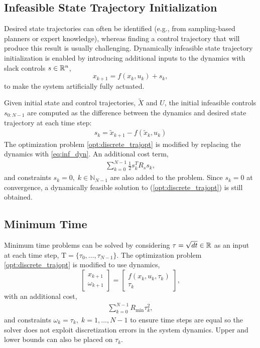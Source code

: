 \documentclass[../root.tex]{subfiles}
\begin{document}
\subsection{Infeasible State Trajectory Initialization}
    Desired state trajectories can often be identified (e.g., from sampling-based
    planners or expert knowledge), whereas finding a control trajectory that will
    produce this result is usually challenging. Dynamically infeasible state
    trajectory initialization is enabled by introducing additional inputs to the
    dynamics with slack controls $s \in \mathbb{R}^{n}$,
    \begin{equation}
        x_{k+1} = f(x_k,u_k) + s_k \label{eq:inf_dyn},
    \end{equation}
    to make the system artificially fully actuated. 

    Given initial state and control trajectories, $\tilde{X}$ and $U$, the
    initial infeasible controls $s_{0:N-1}$ are computed as the difference
    between the dynamics and desired state trajectory at each time step:
    \begin{align}
        s_k = \tilde{x}_{k+1} - f(\tilde{x}_k,u_k) \label{infeasible_controls}
    \end{align}
    The optimization problem \eqref{opt:discrete_trajopt} is modified by
    replacing the dynamics with \eqref{eq:inf_dyn}. An additional cost term,
    \begin{align}
        \sum_{k=0}^{N-1}\frac{1}{2}s_k^T R_s s_k \label{eq:inf_cost},
    \end{align}
    and constraints $s_k = 0, \; k \in \mathbb{N}_{N-1} \label{eq:inf_con}$ are also
    added to the problem. Since $s_k = 0$ at convergence, a dynamically feasible
    solution to (\ref{opt:discrete_trajopt}) is still obtained.

    \subsection{Minimum Time}
    Minimum time problems can be solved by considering $\tau = \sqrt{dt} \in
    \mathbb{R}$ as an input at each time step, $\mathrm{T} =
    \{\tau_0,\dots,\tau_{N-1}\}$. The optimization problem
    \eqref{opt:discrete_trajopt} is modified to use dynamics,
    \begin{equation}
        \begin{bmatrix} x_{k+1} \\ \omega_{k+1} \end{bmatrix} = \begin{bmatrix} f(x_k,u_k,\tau_k) \\ \tau_k \end{bmatrix} \label{min_time_dyn},
    \end{equation}
    with an additional cost,
    \begin{align}
        \sum_{k=0}^{N-1} R_{\text{min}}\tau_k^2 \label{min_time_cost},
    \end{align}
    and constraints $\omega_k= \tau_k, \; k{=}1,\dots,N{-}1$ to ensure time
    steps are equal so the solver does not exploit discretization errors in
    the system dynamics. Upper and lower bounds can also be placed on
    $\tau_k$.
\end{document}

